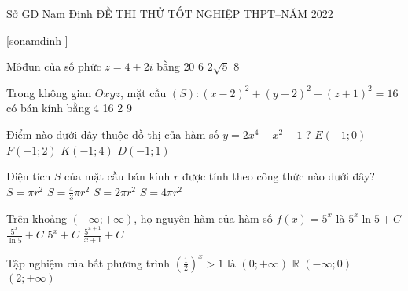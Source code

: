 \begin{name}
{Sở GD Nam Định}
{ĐỀ THI THỬ TỐT NGHIỆP THPT--NĂM 2022 }
\end{name}
[sonamdinh-]

\begin{ex} 
 Môđun của số phức $z=4+2 i$ bằng
\choice 
 { 20 } 
 { 6 } 
 { $2 \sqrt{5}$} 
 { 8 }
\end{ex} 
 
\begin{ex} 
 Trong không gian $O x y z$, mặt cầu $(S):(x-2)^{2}+(y-2)^{2}+(z+1)^{2}=16$ có bán kính bằng
\choice 
 { 4 } 
 { 16 } 
 { 2 } 
 { 9 }
\end{ex} 
 
\begin{ex} 
 Điểm nào dưới đây thuộc đồ thị của hàm số $y=2 x^{4}-x^{2}-1$ ?
\choice 
 { $E(-1 ; 0)$} 
 { $F(-1 ; 2)$} 
 { $K(-1 ; 4)$} 
 { $D(-1 ; 1)$}
\end{ex} 
 
\begin{ex} 
 Diện tích $S$ của mặt cầu bán kính $r$ được tính theo công thức nào dưới đây?
\choice 
 { $S=\pi r^{2}$} 
 { $S=\frac{4}{3} \pi r^{2}$} 
 { $S=2 \pi r^{2}$} 
 { $S=4 \pi r^{2}$}
\end{ex} 
 
\begin{ex} 
 Trên khoảng $(-\infty ;+\infty)$, họ nguyên hàm của hàm số $f(x)=5^{x}$ là
\choice 
 { $5^{x} \ln 5+C$} 
 { $\frac{5^{x}}{\ln 5}+C$} 
 { $5^{x}+C$} 
 { $\frac{5^{x+1}}{x+1}+C$}
\end{ex} 
 
 
\begin{ex} 
 Tập nghiệm của bất phương trình $\left(\frac{1}{2}\right)^{x}>1$ là
\choice 
 { $(0 ;+\infty)$} 
 { $\mathbb{R}$} 
 { $(-\infty ; 0)$} 
 { $(2 ;+\infty)$}
\end{ex} 
 

